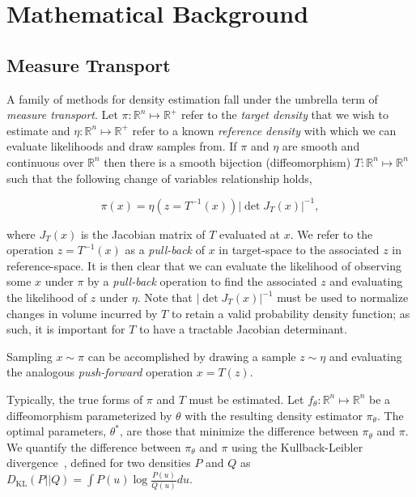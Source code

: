 \chapter{Mathematical Background}\label{ch:background}

\section{Measure Transport}\label{sec:measure-transport}

A family of methods for density estimation fall under the umbrella term of \textit{measure transport}.
Let $\pi: \mathbb{R}^n \mapsto \mathbb{R}^+$ refer to the \textit{target density} that we wish to estimate
and $\eta: \mathbb{R}^n \mapsto \mathbb{R}^+$ refer to a known \textit{reference density} with which we can evaluate
likelihoods and draw samples from.
If $\pi$ and $\eta$ are smooth and continuous over $\mathbb{R}^n$ then there is a smooth bijection (diffeomorphism)
$T: \mathbb{R}^n \mapsto \mathbb{R}^n$ such that the following change of variables relationship holds,

\begin{equation*}
    \pi(x) = \eta\left( z=T^{-1}(x) \right) \left| \det J_T(x) \right|^{-1},
    \label{eq:change-of-vars}
\end{equation*}

where $J_T(x)$ is the Jacobian matrix of $T$ evaluated at $x$.
We refer to the operation $z = T^{-1}(x)$ as a \textit{pull-back} of $x$ in target-space to the associated $z$ in
reference-space.
It is then clear that we can evaluate the likelihood of observing some $x$ under $\pi$ by a
\textit{pull-back} operation to find the associated $z$ and evaluating the likelihood of $z$ under $\eta$.
Note that $\left| \det J_T(x) \right|^{-1}$ must be used to normalize changes in volume incurred by $T$ to retain a
valid probability density function; as such, it is important for $T$ to have a tractable Jacobian determinant.

Sampling $x \sim \pi$ can be accomplished by drawing a sample $z \sim \eta$ and evaluating the analogous
\textit{push-forward} operation $x = T(z)$.

Typically, the true forms of $\pi$ and $T$ must be estimated.
Let $f_\theta : \mathbb{R}^n \mapsto \mathbb{R}^n$ be a diffeomorphism parameterized by $\theta$ with the resulting
density estimator $\pi_\theta$.
The optimal parameters, $\theta^*$, are those that minimize the difference between $\pi_\theta$ and $\pi$.
We quantify the difference between $\pi_\theta$ and $\pi$ using the Kullback-Leibler divergence~\cite{kl_div},
defined for two densities $P$ and $Q$ as $D_{\text{KL}}(P || Q) = \int P(u) \log \frac{P(u)}{Q(u)} du$.


